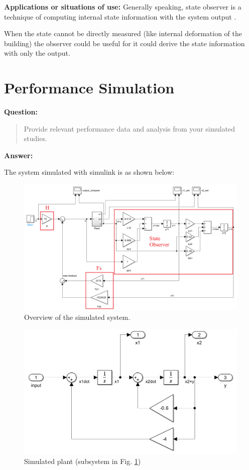 \documentclass[12pt, oneside]{article}
\begin{document}
\textbf{Applications or situations of use:}
Generally speaking, state observer is a technique of computing internal state information with the system output \cite{Observer}.

When the state cannot be directly measured (like internal deformation of the building) the observer could be useful for it could derive the state information with only the output. 

\section{Performance Simulation}
\label{Performance Simulation}
\textbf{Question:}
\begin{quote}
    Provide relevant performance data and analysis from your simulated studies.
\end{quote}
\textbf{Answer:}

The system simulated with simulink is as shown below:
\begin{figure}[htbp]
    \centering
    \includegraphics[width = \linewidth]{Report/pics/WholeSystem.png}
    \caption{Overview of the simulated system.}
    \label{fig:WholeSystem}
\end{figure}

\begin{figure}[htbp]
    \centering
    \includegraphics[width=0.5\linewidth]{Report/pics/Plant.png}
    \caption{Simulated plant (subsystem in Fig. \ref{fig:WholeSystem})}
    \label{fig:Plant}
\end{figure}
\end{document}
